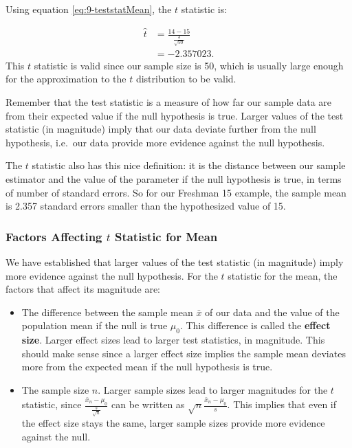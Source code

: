 \documentclass[
]{book}
\begin{document}
Using equation \eqref{eq:9-teststatMean}, the \(t\) statistic is:

\[
\begin{split}
\hat{t} &= \frac{14-15}{\frac{3}{\sqrt{50}}} \\
        &= -2.357023.
\end{split}
\]
This \(t\) statistic is valid since our sample size is 50, which is usually large enough for the approximation to the \(t\) distribution to be valid.

Remember that the test statistic is a measure of how far our sample data are from their expected value if the null hypothesis is true. Larger values of the test statistic (in magnitude) imply that our data deviate further from the null hypothesis, i.e.~our data provide more evidence against the null hypothesis.

The \(t\) statistic also has this nice definition: it is the distance between our sample estimator and the value of the parameter if the null hypothesis is true, in terms of number of standard errors. So for our Freshman 15 example, the sample mean is 2.357 standard errors smaller than the hypothesized value of 15.

\hypertarget{factors}{%
\subsubsection{\texorpdfstring{Factors Affecting \(t\) Statistic for Mean}{Factors Affecting t Statistic for Mean}}\label{factors}}

We have established that larger values of the test statistic (in magnitude) imply more evidence against the null hypothesis. For the \(t\) statistic for the mean, the factors that affect its magnitude are:

\begin{itemize}
\item
  The difference between the sample mean \(\bar{x}\) of our data and the value of the population mean if the null is true \(\mu_0\). This difference is called the \textbf{effect size}. Larger effect sizes lead to larger test statistics, in magnitude. This should make sense since a larger effect size implies the sample mean deviates more from the expected mean if the null hypothesis is true.
\item
  The sample size \(n\). Larger sample sizes lead to larger magnitudes for the \(t\) statistic, since \(\frac{\bar{x}_n - \mu_0}{\frac{s}{\sqrt{n}}}\) can be written as \(\sqrt{n}\frac{\bar{x}_n - \mu_0}{s}\). This implies that even if the effect size stays the same, larger sample sizes provide more evidence against the null.
\end{itemize}
\end{document}
